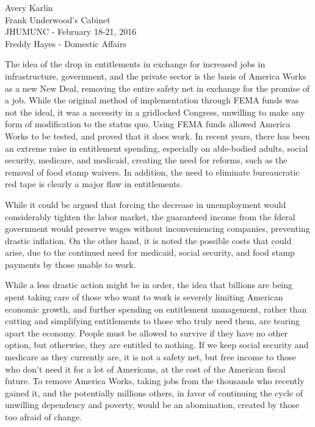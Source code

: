 \documentclass[12pt]{article}
\begin{document}
\begin{flushleft}
Avery Karlin \\
Frank Underwood's Cabinet \\
JHUMUNC - February 18-21, 2016 \\
Freddy Hayes - Domestic Affairs
\end{flushleft}


The idea of the drop in entitlements in exchange for increased jobs in infrastructure, government, and the private sector is the basis of America Works as a new New Deal, removing the entire safety net in exchange for the promise of a job. While the original method of implementation through FEMA funds was not the ideal, it was a necessity in a gridlocked Congress, unwilling to make any form of modification to the status quo. Using FEMA funds allowed America Works to be tested, and proved that it does work. In recent years, there has been an extreme raise in entitlement spending, especially on able-bodied adults, social security, medicare, and medicaid, creating the need for reforms, such as the removal of food stamp waivers. In addition, the need to eliminate bureaucratic red tape is clearly a major flaw in entitlements.

While it could be argued that forcing the decrease in unemployment would considerably tighten the labor market, the guaranteed income from the fderal government would preserve wages without inconveniencing companies, preventing drastic inflation. On the other hand, it is noted the possible costs that could arise, due to the continued need for medicaid, social security, and food stamp payments by those unable to work.

While a less drastic action might be in order, the idea that billions are being spent taking care of those who want to work is severely limiting American economic growth, and further spending on entitlement management, rather than cutting and simplifying entitlements to those who truly need them, are tearing apart the economy. People must be allowed to survive if they have no other option, but otherwise, they are entitled to nothing. If we keep social security and medicare as they currently are, it is not a safety net, but free income to those who don't need it for a lot of Americans, at the cost of the American fiscal future. To remove America Works, taking jobs from the thousands who recently gained it, and the potentially millions others, in favor of continuing the cycle of unwilling dependency and poverty, would be an abomination, created by those too afraid of change.
\end{document}
